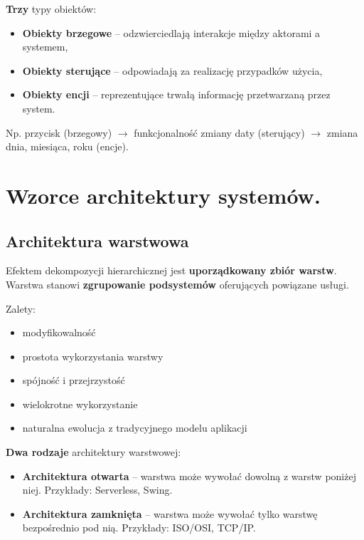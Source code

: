 \documentclass[main.tex]{subfiles}
\begin{document}
    \textbf{Trzy} typy obiektów:
    \begin{itemize}
        \item \textbf{Obiekty brzegowe} -- odzwierciedlają interakcje między aktorami a systemem,
        \item \textbf{Obiekty sterujące} -- odpowiadają za realizację przypadków użycia,
        \item \textbf{Obiekty encji} -- reprezentujące trwałą informację przetwarzaną przez system.
    \end{itemize}
    Np. przycisk (brzegowy) $\rightarrow$ funkcjonalność zmiany daty (sterujący)  $\rightarrow$ zmiana dnia, miesiąca,
    roku (encje).


    \section{Wzorce architektury systemów.}

    \subsection{Architektura warstwowa}

    Efektem dekompozycji hierarchicznej jest \textbf{uporządkowany zbiór warstw}. Warstwa stanowi
    \textbf{zgrupowanie podsystemów} oferujących powiązane usługi.

    \noindent Zalety:
    \begin{itemize}[noitemsep]
        \item modyfikowalność
        \item prostota wykorzystania warstwy
        \item spójność i przejrzystość
        \item wielokrotne wykorzystanie
        \item naturalna ewolucja z tradycyjnego modelu aplikacji
    \end{itemize}

    \noindent \textbf{Dwa rodzaje} architektury warstwowej:
    \begin{itemize}
        \item \textbf{Architektura otwarta} -- warstwa może wywołać dowolną z warstw poniżej niej.
        Przykłady: Serverless, Swing.

        \item \textbf{Architektura zamknięta} -- warstwa może wywołać tylko warstwę bezpośrednio pod nią.
        Przykłady: ISO/OSI, TCP/IP.
    \end{itemize}
\end{document}
